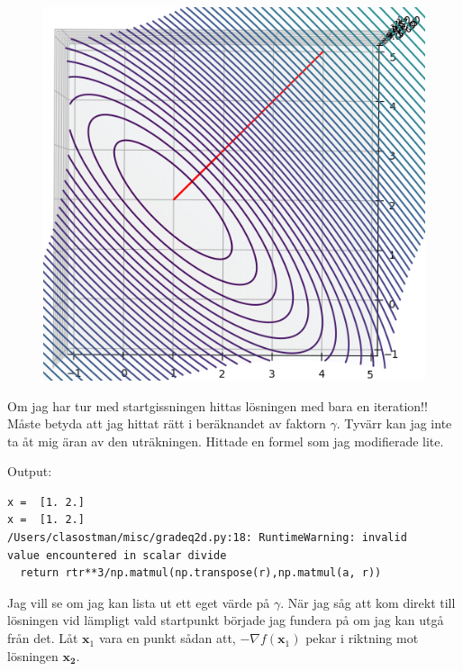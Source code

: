 \documentclass{article}
\begin{document}
\newpage
\begin{figure}
    \includegraphics[width=\textwidth]{exempel_2.png}
\end{figure}
Om jag har tur med startgissningen hittas lösningen med bara en iteration!! 
Måste betyda att jag hittat rätt i beräknandet av faktorn $\gamma$.
Tyvärr kan jag inte ta åt mig äran av den uträkningen. Hittade en formel
som jag modifierade lite.

Output:
\begin{verbatim}
x =  [1. 2.]
x =  [1. 2.]
/Users/clasostman/misc/gradeq2d.py:18: RuntimeWarning: invalid 
value encountered in scalar divide
  return rtr**3/np.matmul(np.transpose(r),np.matmul(a, r))
\end{verbatim}
\newpage
Jag vill se om jag kan lista ut ett eget värde på $\gamma$. När jag såg att kom direkt
till lösningen vid lämpligt vald startpunkt började jag fundera på om jag kan utgå från det.
Låt $\mathbf{x}_1$ vara en punkt sådan att, $-\nabla f(\mathbf{x}_1)$ pekar i riktning mot lösningen $\mathbf{x_2}$. 
\end{document}
